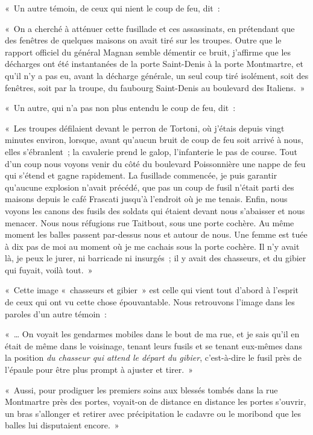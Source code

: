 \documentclass[french,twoside]{book} %
\newenvironment{quoteblock}%
  {\begin{quoting}}
  {\end{quoting}}
\newenvironment{quotebar}{%
    \def\FrameCommand{{\color{rubric!10!}\vrule width 0.5em} \hspace{0.9em}}%
    \def\OuterFrameSep{\itemsep} %
    \MakeFramed {\advance\hsize-\width \FrameRestore}
  }%
  {%
    \endMakeFramed
  }
\renewenvironment{quoteblock}%
  {%
    \savenotes
    \setstretch{0.9}
    \normalfont
    \begin{quotebar}
  }
  {%
    \end{quotebar}
    \spewnotes
  }
\begin{document}
\noindent « Un autre témoin, de ceux qui nient le coup de feu, dit :\par

\begin{quoteblock}
 \noindent « On a cherché à atténuer cette fusillade et ces assassinats, en prétendant que des fenêtres de quelques maisons on avait tiré sur les troupes. Outre que le rapport officiel du général Magnan semble démentir ce bruit, j’affirme que les décharges ont été instantanées de la porte Saint-Denis à la porte Montmartre, et qu’il n’y a pas eu, avant la décharge générale, un seul coup tiré isolément, soit des fenêtres, soit par la troupe, du faubourg Saint-Denis au boulevard des Italiens. »
 \end{quoteblock}

\noindent « Un autre, qui n’a pas non plus entendu le coup de feu, dit :\par

\begin{quoteblock}
 \noindent « Les troupes défilaient devant le perron de Tortoni, où j’étais depuis vingt minutes environ, lorsque, avant qu’aucun bruit de coup de feu soit arrivé à nous, elles s’ébranlent ; la cavalerie prend le galop, l’infanterie le pas de course. Tout d’un coup nous voyons venir du côté du boulevard Poissonnière une nappe de feu qui s’étend et gagne rapidement. La fusillade commencée, je puis garantir qu’aucune explosion n’avait précédé, que pas un coup de fusil n’était parti des maisons depuis le café Frascati jusqu’à l’endroit où je me tenais. Enfin, nous voyons les canons des fusils des soldats qui étaient devant nous s’abaisser et nous menacer. Nous nous réfugions rue Taitbout, sous une porte cochère. Au même moment les balles passent par-dessus nous et autour de nous. Une femme est tuée à dix pas de moi au moment où je me cachais sous la porte cochère. Il n’y avait là, je peux le jurer, ni barricade ni insurgés ; il y avait des chasseurs, et du gibier qui fuyait, voilà tout. »
 \end{quoteblock}

\noindent « Cette image « chasseurs et gibier » est celle qui vient tout d’abord à l’esprit de ceux qui ont vu cette chose épouvantable. Nous retrouvons l’image dans les paroles d’un autre témoin :\par

\begin{quoteblock}
 \noindent « … On voyait les gendarmes mobiles dans le bout de ma rue, et je sais qu’il en était de même dans le voisinage, tenant leurs fusils et se tenant eux-mêmes dans la position \emph{du chasseur qui attend le départ du gibier}, c’est-à-dire le fusil près de l’épaule pour être plus prompt à ajuster et tirer. »\par
 « Aussi, pour prodiguer les premiers soins aux blessés tombés dans la rue Montmartre près des portes, voyait-on de distance en distance les portes s’ouvrir, un bras s’allonger et retirer avec précipitation le cadavre ou le moribond que les balles lui disputaient encore. »
 \end{quoteblock}
\end{document}

